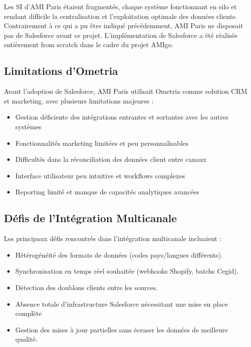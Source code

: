Les SI d'AMI Paris étaient fragmentés, chaque système fonctionnant en silo et rendant difficile la centralisation et l'exploitation optimale des données clients. Contrairement à ce qui a pu être indiqué précédemment, AMI Paris ne disposait pas de Salesforce avant ce projet. L'implémentation de Salesforce a été réalisée entièrement from scratch dans le cadre du projet AMIgo.

\subsection{Limitations d'Ometria}

Avant l'adoption de Salesforce, AMI Paris utilisait Ometria comme solution CRM et marketing, avec plusieurs limitations majeures :

\begin{itemize}
    \item Gestion déficiente des intégrations entrantes et sortantes avec les autres systèmes
    \item Fonctionnalités marketing limitées et peu personnalisables
    \item Difficultés dans la réconciliation des données client entre canaux
    \item Interface utilisateur peu intuitive et workflows complexes
    \item Reporting limité et manque de capacités analytiques avancées
\end{itemize}

\subsection{Défis de l'Intégration Multicanale}

Les principaux défis rencontrés dans l'intégration multicanale incluaient :

\begin{itemize}
    \item Hétérogénéité des formats de données (codes pays/langues différents).
    \item Synchronisation en temps réel souhaitée (webhooks Shopify, batchs Cegid).
    \item Détection des doublons clients entre les sources.
    \item Absence totale d'infrastructure Salesforce nécessitant une mise en place complète
    \item Gestion des mises à jour partielles sans écraser les données de meilleure qualité.
\end{itemize}

